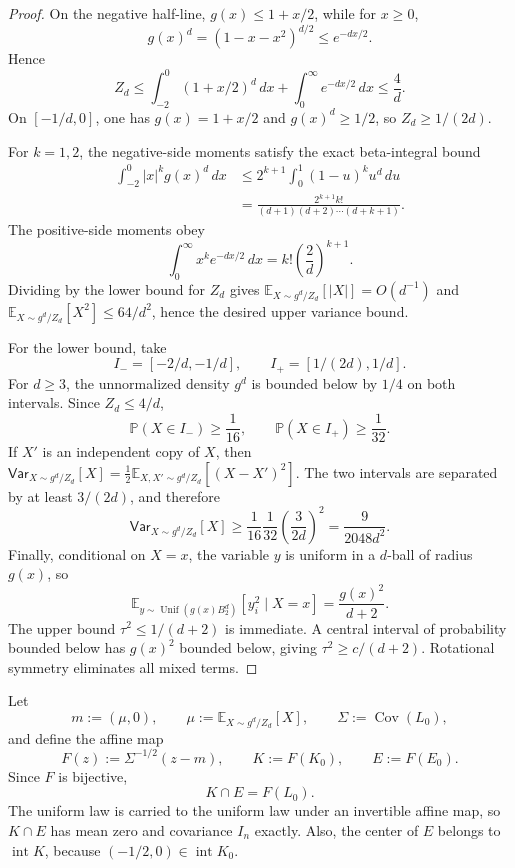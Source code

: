 \documentclass[11pt]{article}
\numberwithin{equation}{section}
\theoremstyle{definition}
\newcommand{\E}[2]{\mathbb{E}_{#1}\left[#2\right]}
\newcommand{\V}[2]{\mathsf{Var}_{#1}\left[#2\right]}
\begin{document}
\begin{proof}
On the negative half-line, $g(x)\leq 1+x/2$, while for
$x\geq 0$,
\[
g(x)^d
=(1-x-x^2)^{d/2}
\leq e^{-dx/2}.
\]
Hence
\[
Z_d
\leq\int_{-2}^{0}(1+x/2)^d\,dx +\int_0^\infty e^{-dx/2}\,dx
\leq\frac4d.
\]
On $[-1/d,0]$, one has
$g(x)=1+x/2$ and
$g(x)^d\geq 1/2$, so
$Z_d\geq 1/(2d)$.

For $k=1,2$, the negative-side moments satisfy the exact beta-integral bound
\begin{equation}
\label{app:counterexample:eq:negative-moments}
\begin{aligned}
  \int_{-2}^{0}|x|^k g(x)^d\,dx
  &\leq 2^{k+1}\int_0^1(1-u)^k u^d\,du\\
  &=\frac{2^{k+1}k!}{(d+1)(d+2)\cdots(d+k+1)}.
\end{aligned}
\end{equation}
The positive-side moments obey
\[
  \int_0^\infty x^k e^{-dx/2}\,dx=k!\left(\frac2d\right)^{k+1}.
\]
Dividing by the lower bound for $Z_d$ gives
$\E{X\sim g^d/Z_d}{|X|}=O(d^{-1})$ and
$\E{X\sim g^d/Z_d}{X^2}\leq 64/d^2$, hence the desired upper variance bound.

For the lower bound, take
\[
I_-=[-2/d,-1/d],
\qquad
I_+=[1/(2d),1/d].
\]
For $d\geq 3$, the unnormalized density
$g^d$ is bounded below by
$1/4$ on both intervals.
Since $Z_d\leq 4/d$,
\[
\mathbb{P}(X\in I_-)\geq\frac1{16},
\qquad
\mathbb{P}(X\in I_+)\geq\frac1{32}.
\]
If $X'$ is an independent copy of
$X$, then
$\V{X\sim g^d/Z_d}{X}=\tfrac12\E{X,X'\sim g^d/Z_d}{(X-X')^2}$.
The two intervals are separated by at least $3/(2d)$, and therefore
\[
\V{X\sim g^d/Z_d}{X}
\geq \frac1{16}\frac1{32}\left(\frac3{2d}\right)^2
=\frac9{2048d^2}.
\]
Finally, conditional on $X=x$, the variable
$y$ is uniform in a
$d$-ball of radius
$g(x)$, so
\[
  \E{y\sim\operatorname{Unif}(g(x)B_2^d)}{y_i^2\mid X=x}=\frac{g(x)^2}{d+2}.
\]
The upper bound $\tau^2\leq 1/(d+2)$ is immediate.
A central interval of probability bounded below has $g(x)^2$ bounded below,
giving
$\tau^2\geq c/(d+2)$.
Rotational symmetry eliminates all mixed terms.
\end{proof}

Let
\[
m:=(\mu,0),
\qquad
\mu:=\E{X\sim g^d/Z_d}{X},
\qquad
\Sigma:=\operatorname{Cov}(L_0),
\]
and define the affine map
\begin{equation}
F(z):=\Sigma^{-1/2}(z-m),
\qquad
K:=F(K_0),
\qquad
E:=F(E_0).
\label{app:counterexample:eq:affine-map}
\end{equation}
Since $F$ is bijective,
\[
  K\cap E=F(L_0).
\]
The uniform law is carried to the uniform law under an invertible affine map, so
$K\cap E$ has mean zero and covariance
$I_n$ exactly.
Also, the center of $E$ belongs to
$\operatorname{int}K$, because
$(-1/2,0)\in\operatorname{int}K_0$.
\end{document}

